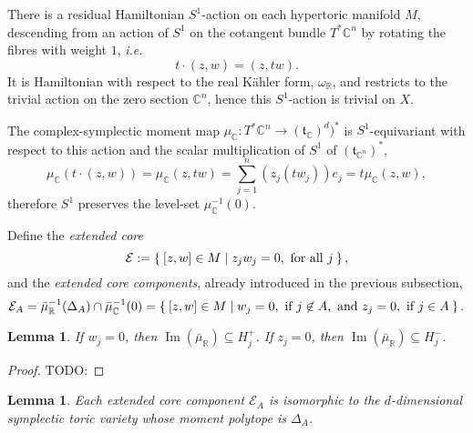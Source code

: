 \documentclass{amsart}
\newtheorem{lemma}[theorem]{Lemma}
\newcommand{\ie}{\emph{i.e.} }
\newcommand{\ra}{\rightarrow}
\newcommand{\w}{\omega}
\newcommand{\RR}{\mathbb{R}}
\newcommand{\CC}{\mathbb{C}}
\newcommand{\mcE}{\mathcal{E}}
\newcommand{\mft}{\mathfrak{t}}
\DeclareMathOperator{\Image}{Im}
\begin{document}
	There is a residual Hamiltonian $S^{1}$-action on each hypertoric manifold $M$, descending from an action of $S^{1}$ on the cotangent bundle $T^{\ast}\CC^{n}$ by rotating the fibres with weight $1$, \ie
	\[
		t\cdot (z,w) = (z,tw).
	\]
	It is Hamiltonian with respect to the real K\"ahler form, $\w_{\RR}$, and restricts to the trivial action on the zero section $\CC^{n}$, hence this $S^{1}$-action is trivial on $X$.
	
	The complex-symplectic moment map $\mu_{\CC} : T^{\ast}\CC^{n} \ra (\mft_{\CC})^{d})^{\ast}$ is $S^{1}$-equivariant with respect to this action and the scalar multiplication of $S^{1}$ of $(\mft_{\CC^{n}})^{\ast}$,
		\[
		\mu_{\CC}\left(t\cdot(z,w)\right) = \mu_{\CC}(z,tw) = \sum_{j=1}^{n}\left(z_{j}(tw_{j})\right)e_{j} = t\mu_{\CC}(z,w),
		\]
	therefore $S^{1}$ preserves the level-set $\mu_{\CC}^{-1}(0)$. 
	
	Define the \emph{extended core}
	\[
		\mcE := \Set{[z,w] \in M | z_{j}w_{j} = 0, \text{ for all } j },
	\]
	and the \emph{extended core components}, already introduced in the previous subsection,
	\[
		\mcE_{A} = \bar{\mu}_{\RR}^{-1}(\Delta_{A})\cap \bar{\mu}_{\CC}^{-1}(0) = \Set{[z,w] \in M | w_{j} = 0, \text{ if } j \not\in A, \text{ and } z_{j} = 0, \text{ if } j \in A}.
	\]
	\begin{lemma}
		If $w_{j} = 0$, then $\Image(\bar{\mu}_{\RR}) \subseteq H_{j}^{+}$. If $z_{j} = 0$, then $\Image(\bar{\mu}_{\RR}) \subseteq H_{j}^{-}$.
	\end{lemma}
	
	\begin{proof}
		TODO:
	\end{proof}

	\begin{lemma}
		Each extended core component $\mcE_{A}$ is isomorphic to the $d$-dimensional symplectic toric variety whose moment polytope is $\Delta_{A}$.
	\end{lemma}
\end{document}
